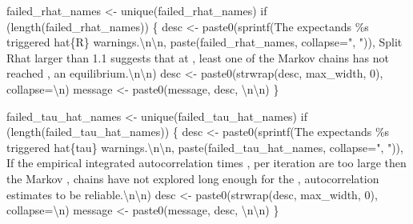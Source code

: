 \documentclass[
  letterpaper,
  DIV=11,
  numbers=noendperiod]{scrartcl}
\newenvironment{Shaded}{\begin{snugshade}}{\end{snugshade}}
\newcommand{\CharTok}[1]{\textcolor[rgb]{0.13,0.47,0.30}{#1}}
\newcommand{\ControlFlowTok}[1]{\textcolor[rgb]{0.00,0.23,0.31}{#1}}
\newcommand{\DecValTok}[1]{\textcolor[rgb]{0.68,0.00,0.00}{#1}}
\newcommand{\NormalTok}[1]{\textcolor[rgb]{0.00,0.23,0.31}{#1}}
\newcommand{\OperatorTok}[1]{\textcolor[rgb]{0.37,0.37,0.37}{#1}}
\newcommand{\SpecialCharTok}[1]{\textcolor[rgb]{0.37,0.37,0.37}{#1}}
\newcommand{\StringTok}[1]{\textcolor[rgb]{0.13,0.47,0.30}{#1}}
\begin{document}
\begin{Shaded}
\begin{Highlighting}[]
\NormalTok{  failed\_rhat\_names }\OperatorTok{\textless{}{-}}\NormalTok{ unique(failed\_rhat\_names)}
  \ControlFlowTok{if}\NormalTok{ (length(failed\_rhat\_names)) \{}
\NormalTok{    desc }\OperatorTok{\textless{}{-}} 
\NormalTok{      paste0(sprintf(}\StringTok{\textquotesingle{}The expectands }\SpecialCharTok{\%s}\StringTok{ triggered hat}\SpecialCharTok{\{R\}}\StringTok{ warnings.}\CharTok{\textbackslash{}n\textbackslash{}n}\StringTok{\textquotesingle{}}\NormalTok{,}
\NormalTok{             paste(failed\_rhat\_names, collapse}\OperatorTok{=}\StringTok{", "}\NormalTok{)),}
             \StringTok{\textquotesingle{}  Split Rhat larger than 1.1 suggests that at \textquotesingle{}}\NormalTok{,}
             \StringTok{\textquotesingle{}least one of the Markov chains has not reached \textquotesingle{}}\NormalTok{,}
             \StringTok{\textquotesingle{}an equilibrium.}\CharTok{\textbackslash{}n\textbackslash{}n}\StringTok{\textquotesingle{}}\NormalTok{)}
\NormalTok{    desc }\OperatorTok{\textless{}{-}}\NormalTok{ paste0(strwrap(desc, max\_width, }\DecValTok{0}\NormalTok{), collapse}\OperatorTok{=}\StringTok{\textquotesingle{}}\CharTok{\textbackslash{}n}\StringTok{\textquotesingle{}}\NormalTok{)}
\NormalTok{    message }\OperatorTok{\textless{}{-}}\NormalTok{ paste0(message, desc, }\StringTok{\textquotesingle{}}\CharTok{\textbackslash{}n\textbackslash{}n}\StringTok{\textquotesingle{}}\NormalTok{)}
\NormalTok{  \}}
  
\NormalTok{  failed\_tau\_hat\_names }\OperatorTok{\textless{}{-}}\NormalTok{ unique(failed\_tau\_hat\_names)}
  \ControlFlowTok{if}\NormalTok{ (length(failed\_tau\_hat\_names)) \{}
\NormalTok{    desc }\OperatorTok{\textless{}{-}}
\NormalTok{      paste0(sprintf(}\StringTok{\textquotesingle{}The expectands }\SpecialCharTok{\%s}\StringTok{ triggered hat}\SpecialCharTok{\{tau\}}\StringTok{ warnings.}\CharTok{\textbackslash{}n\textbackslash{}n}\StringTok{\textquotesingle{}}\NormalTok{,}
\NormalTok{             paste(failed\_tau\_hat\_names, collapse}\OperatorTok{=}\StringTok{", "}\NormalTok{)),}
             \StringTok{\textquotesingle{}If the empirical integrated autocorrelation times \textquotesingle{}}\NormalTok{,}
             \StringTok{\textquotesingle{}per iteration are too large then the Markov \textquotesingle{}}\NormalTok{,}
             \StringTok{\textquotesingle{}chains have not explored long enough for the \textquotesingle{}}\NormalTok{,}
             \StringTok{\textquotesingle{}autocorrelation estimates to be reliable.}\CharTok{\textbackslash{}n\textbackslash{}n}\StringTok{\textquotesingle{}}\NormalTok{)}
\NormalTok{    desc }\OperatorTok{\textless{}{-}}\NormalTok{ paste0(strwrap(desc, max\_width, }\DecValTok{0}\NormalTok{), collapse}\OperatorTok{=}\StringTok{\textquotesingle{}}\CharTok{\textbackslash{}n}\StringTok{\textquotesingle{}}\NormalTok{)}
\NormalTok{    message }\OperatorTok{\textless{}{-}}\NormalTok{ paste0(message, desc, }\StringTok{\textquotesingle{}}\CharTok{\textbackslash{}n\textbackslash{}n}\StringTok{\textquotesingle{}}\NormalTok{)}
\NormalTok{  \}}


\end{Highlighting}
\end{Shaded}
\end{document}
